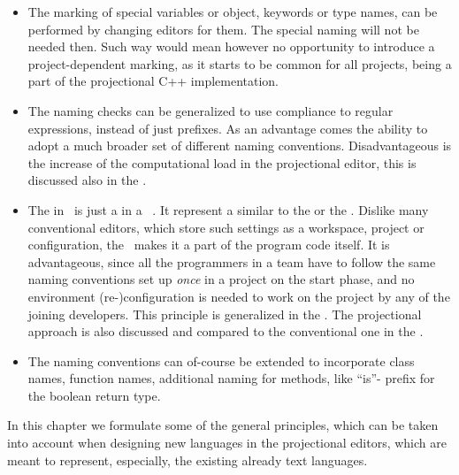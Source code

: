   \begin{itemize}
   \item  The marking of special variables or object, keywords or type names, can be performed by changing editors for them. The special
naming will not be needed then. Such way would mean however no opportunity to introduce a project-dependent marking, as it starts to be
common for all projects, being a part of the projectional C++ implementation.

\item The naming checks can be generalized to use compliance to regular expressions, instead of just prefixes. As an advantage comes the
ability to adopt a much broader set of different naming conventions. Disadvantageous is the increase
of the computational load in the projectional editor, this is discussed also in the .

\item The  in \pcpp\ is just a  in a \jbmps\ . It represent a similar 
 to the  or the  . 
Dislike many conventional editors, which store such settings as a workspace, project or  configuration, the
\pcpp\ makes it a part of the program code itself. It is advantageous, since all the programmers in a team have to follow the 
same naming conventions set up \emph{once} in a project on the start phase, and no environment (re-)configuration is needed to work on the project by
any of the joining developers. This principle is generalized in the . 
The projectional approach is also discussed and compared to the conventional one in the .

\item The naming conventions can of-course be extended to incorporate class names, function names, additional naming for methods,
like ``is''- prefix for the boolean return type. 


  \end{itemize}

 


In this chapter we formulate some of the general principles, which can be taken into
account when designing new languages in the projectional editors, which are meant to represent, especially,
the existing already text languages.

